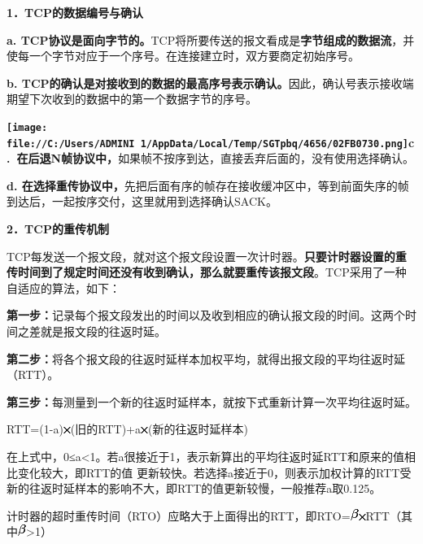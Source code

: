 \textbf{{1．TCP的数据编号与确认}}

\textbf{a.
TCP协议是面向字节的。}TCP将所要传送的报文看成是\textbf{字节组成的数据流}，并使每一个字节对应于一个序号。在连接建立时，双方要商定初始序号。

\textbf{b.
TCP的确认是对接收到的数据的最高序号表示确认。}因此，确认号表示接收端期望下次收到的数据中的第一个数据字节的序号。

\textbf{\texttt{[image: file://C:/Users/ADMINI~1/AppData/Local/Temp/SGTpbq/4656/02FB0730.png]}c.~在后退N帧协议中，}如果帧不按序到达，直接丢弃后面的，没有使用选择确认。

\textbf{d.
在选择重传协议中，}先把后面有序的帧存在接收缓冲区中，等到前面失序的帧到达后，一起按序交付，这里就用到选择确认SACK。

\textbf{{2．TCP的重传机制}}

TCP每发送一个报文段，就对这个报文段设置一次计时器。\textbf{{只要计时器设置的重传时间到了规定时间还没有收到确认，那么就要重传该报文段}}。TCP采用了一种自适应的算法，如下：

{\textbf{第一步：}记录每个报文段发出的时间以及收到相应的确认报文段的时间。这两个时间之差就是报文段的往返时延。}

{\textbf{第二步：}将各个报文段的往返时延样本加权平均，就得出报文段的平均往返时延（}{RTT}{）。}

{\textbf{第三步：}}{每测量到一个新的往返时延样本，就按下式重新计算一次平均往返时延。}

{}

{RTT}={(1}-a{)\includegraphics[width=0.09375in,height=0.08333in]{texmath/ff0c81times}}{(}旧的{RTT)}+a\includegraphics[width=0.09375in,height=0.08333in]{texmath/ff0c81times}{(}新的往返时延样本{)}

{ }

{在上式中，0≤a\textless{}1。若a很接近于1，表示新算出的平均往返时延RTT和原来的值相比变化较大，即RTT的值
更新较快。若选择a接近于0，则表示加权计算的RTT受新的往返时延样本的影响不大，即RTT的值更新较慢，一般推荐a取0.125。}

{计时器的超时重传时间（RTO）应略大于上面得出的RTT，即}{RTO=\includegraphics[width=0.10417in,height=0.14583in]{texmath/338478beta}\includegraphics[width=0.09375in,height=0.08333in]{texmath/ff0c81times}RTT（其中\includegraphics[width=0.10417in,height=0.14583in]{texmath/338478beta}\textgreater{}1）}
